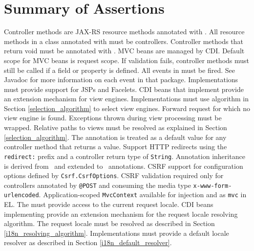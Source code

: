 \chapter{Summary of Assertions}
\label{assertions}

\begin{description}
 Controller methods are JAX-RS resource methods annotated with .
 All resource methods in a class annotated with  must
be controllers.
 Controller methods that return void must be annotated with .
 MVC beans are managed by CDI.
 Default scope for MVC beans is request scope.
 If validation fails, controller methods must still be called if a 
 field or property is defined. 
 All events in  must be fired. See Javadoc for more
information on each event in that package.
 Implementations must provide support for JSPs and Facelets.
 CDI beans that implement  provide
an extension mechanism for view engines.
 Implementations must use algorithm in Section \ref{selection_algorithm} 
to select view engines.
 Forward request for which no view engine is found.
 Exceptions thrown during view processing must be wrapped.
 Relative paths to views must be resolved as explained in 
Section \ref{selection_algorithm}.
 The  annotation is treated as a default value for any controller 
method that returns a  value.
 Support HTTP redirects using the {\tt redirect:} prefix and a controller
return type of {\tt String}.
 Annotation inheritance is derived from \jaxrs\  and extended to 
\mvc\ annotations. 
 CSRF support for configuration options defined by {\tt Csrf.CsrfOptions}.
 CSRF validation required only for controllers annotated by {\tt @POST} 
and consuming the media type {\tt x-www-form-urlencoded}.
 Application-scoped {\tt MvcContext} available for injection and as {\tt mvc} in EL.
 The  must provide access to the current request locale.
 CDI beans implementing  provide an extension mechanism for the request locale resolving algorithm.
 The request locale must be resolved as described in Section \ref{i18n_resolving_algorithm}.
 Implementations must provide a default locale resolver as described in Section \ref{i18n_default_resolver}.
\end{description}
